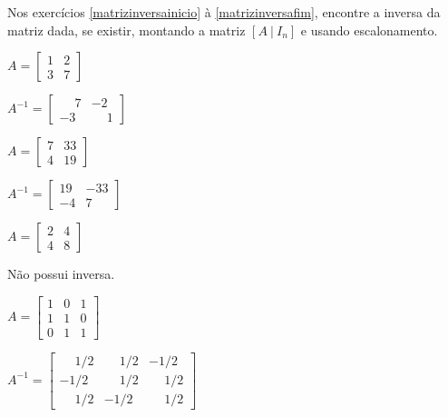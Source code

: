\documentclass[12pt]{exam}
\begin{document}
Nos exercícios \ref{matrizinversainicio} à \ref{matrizinversafim}, encontre a inversa da matriz dada, se existir, montando a matriz $[A\ |\ I_n]$ e usando escalonamento.

\begin{exercicio}\label{matrizinversainicio}
  $
    A =\begin{bmatrix}
        1 & 2\\
        3 & 7
    \end{bmatrix}
  $
  \begin{solucao}
    $A^{-1} =\begin{bmatrix}
      \phantom{-} 7 & -2\\
      -3 & \phantom{-} 1
    \end{bmatrix}$
  \end{solucao}
\end{exercicio}

\begin{exercicio}
  $
    A =\begin{bmatrix}
        7 & 33\\
        4 & 19
    \end{bmatrix}
  $
  \begin{solucao}
    $A^{-1} =\begin{bmatrix}
      19 & -33\\
      -4 & 7
    \end{bmatrix}$
  \end{solucao}
\end{exercicio}


\begin{exercicio}
  $
    A =\begin{bmatrix}
        2 & 4\\
        4 & 8
    \end{bmatrix}
  $
  \begin{solucao}
    Não possui inversa.
  \end{solucao}
\end{exercicio}

\begin{exercicio}
    $
        A = \begin{bmatrix}
                1 & 0 & 1\\
                1 & 1 & 0\\
                0 & 1 & 1
             \end{bmatrix}
    $
    \begin{solucao}
        $
            A^{-1} = \begin{bmatrix}
                        \phantom{-}1/2 & \phantom{-}1/2 & -1/2\\
                        -1/2 & \phantom{-}1/2 & \phantom{-}1/2\\
                        \phantom{-}1/2 & -1/2 & \phantom{-}1/2
                    \end{bmatrix}
         $
     \end{solucao}
\end{exercicio}
\end{document}
